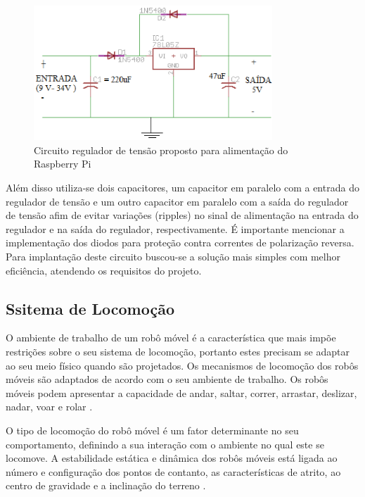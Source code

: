 \begin{figure}[H]
    \centering
    \includegraphics[width=0.8\textwidth]{figuras/esquematico_regulador.eps}
    \caption{Circuito regulador de tensão proposto para alimentação do Raspberry Pi}
    \label{fig:esquematico_regulador}
\end{figure}

Além disso utiliza-se dois capacitores, um capacitor em paralelo com a entrada do regulador de tensão e um outro capacitor em paralelo com a saída do regulador de tensão afim de evitar variações (ripples) no sinal de alimentação na entrada do regulador e na saída do regulador, respectivamente. É importante mencionar a implementação dos diodos para proteção contra correntes de polarização reversa. Para implantação deste circuito buscou-se a solução mais simples com melhor eficiência, atendendo os requisitos do projeto.

\subsection{Ssitema de Locomoção}

O ambiente de trabalho de um robô móvel é a característica que mais impõe restrições sobre o seu sistema de locomoção, portanto estes
precisam se adaptar ao seu meio físico quando são projetados. Os mecanismos de locomoção dos robôs móveis são adaptados de acordo com
o seu ambiente de trabalho. Os robôs móveis podem apresentar a capacidade de andar, saltar, correr, arrastar, deslizar, nadar, voar
e rolar \cite{secchi:2008}.

O tipo de locomoção do robô móvel é um fator determinante no seu comportamento, definindo a sua interação com o ambiente no qual
este se locomove. A estabilidade estática e dinâmica dos robôs móveis está ligada ao número e configuração dos pontos de contanto,
as características de atrito, ao centro de gravidade e a inclinação do terreno \cite{silva:2010}.


